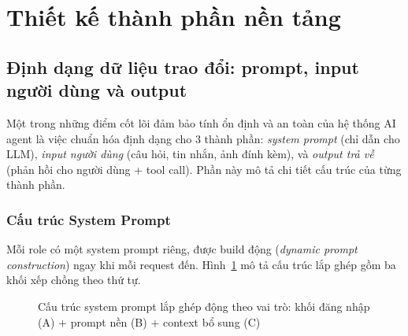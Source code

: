 \documentclass[a4paper,13pt,3p,oneside]{report}
\theoremstyle{definition}
\theoremstyle{remark}
\theoremstyle{definition}
\begin{document}
\section{Thiết kế thành phần nền tảng}

\subsection{Định dạng dữ liệu trao đổi: prompt, input người dùng và output}

Một trong những điểm cốt lõi đảm bảo tính ổn định và an toàn của hệ thống AI agent là việc chuẩn hóa định dạng cho 3 thành phần: \textit{system prompt} (chỉ dẫn cho LLM), \textit{input người dùng} (câu hỏi, tin nhắn, ảnh đính kèm), và \textit{output trả về} (phản hồi cho người dùng + tool call). Phần này mô tả chi tiết cấu trúc của từng thành phần.

\subsubsection{Cấu trúc System Prompt}

Mỗi role có một system prompt riêng, được build động (\textit{dynamic prompt construction}) ngay khi mỗi request đến. Hình~\ref{fig:system-prompt} mô tả cấu trúc lắp ghép gồm ba khối xếp chồng theo thứ tự.

\begin{figure}[htbp]
\centering
{}
\caption{Cấu trúc system prompt lắp ghép động theo vai trò: khối đăng nhập (A) $+$ prompt nền (B) $+$ context bổ sung (C)}
\label{fig:system-prompt}
\end{figure}
\end{document}
